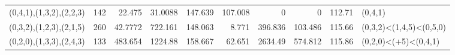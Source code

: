 \begin{tabular}{lrrrrrrrrl}
 (0,4,1),(1,3,2),(2,2,3) &      142   &                           22.475  &                         31.0088 &                           147.639 &                         107.008 &                             0     &                           0     &     112.71 & (0,4,1)                 \\
 (0,3,2),(1,2,3),(2,1,5) &      260   &                           42.7772 &                        722.161  &                           148.063 &                           8.771 &                           396.836 &                         103.486 &     115.66 & (0,3,2)<(1,4,5)<(0,5,0) \\
 (0,2,0),(1,3,3),(2,4,3) &      133   &                          483.654  &                       1224.88   &                           158.667 &                          62.651 &                          2634.49  &                         574.812 &     115.86 & (0,2,0)<(+5)<(0,4,1)    \\
\hline
\end{tabular}